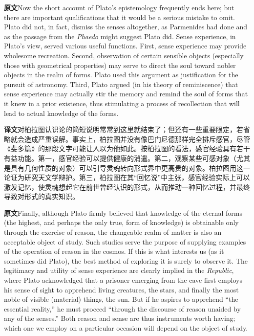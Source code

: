 \documentclass[UTF8,zihao=-4]{ctexart}
\newcommand{\BodyFont}{\fontsize{10.5pt}{15.5pt}\selectfont}
\newcommand{\origlabel}{\textbf{原文}\quad}
\newcommand{\translabel}{\textbf{译文}\quad}
\newcommand{\orig}{\par\noindent\begingroup\BodyFont\origlabel}
\newcommand{\zhline}[1]{\par\endgroup\noindent\begingroup\BodyFont\translabel #1\par\endgroup\vspace{0.35em}}
\begin{document}
\orig Now the short account of Plato's epistemology frequently ends here; but there are important qualifications that it would be a serious mistake to omit. Plato did not, in fact, dismiss the senses altogether, as Parmenides had done and as the passage from the \textit{Phaedo} might suggest Plato did. Sense experience, in Plato's view, served various useful functions. First, sense experience may provide wholesome recreation. Second, observation of certain sensible objects (especially those with geometrical properties) may serve to direct the soul toward nobler objects in the realm of forms. Plato used this argument as justification for the pursuit of astronomy. Third, Plato argued (in his theory of reminiscence) that sense experience may actually stir the memory and remind the soul of forms that it knew in a prior existence, thus stimulating a process of recollection that will lead to actual knowledge of the forms.

\zhline{对柏拉图认识论的简短说明常常到这里就结束了；但还有一些重要限定，若省略就会造成严重误解。事实上，柏拉图并没有像巴门尼德那样完全排斥感官，尽管《斐多篇》的那段文字可能让人以为他如此。按柏拉图的看法，感官经验具有若干有益功能。第一，感官经验可以提供健康的消遣。第二，观察某些可感对象（尤其是具有几何性质的对象）可以引导灵魂转向形式界中更高贵的对象。柏拉图用这一论证为研究天文学辩护。第三，柏拉图在其“回忆说”中主张，感官经验实际上可以激发记忆，使灵魂想起它在前世曾经认识的形式，从而推动一种回忆过程，并最终导致对形式的真实知识。}

\orig Finally, although Plato firmly believed that knowledge of the eternal forms (the highest, and perhaps the only true, form of knowledge) is obtainable only through the exercise of reason, the changeable realm of matter is also an acceptable object of study. Such studies serve the purpose of supplying examples of the operation of reason in the cosmos. If this is what interests us (as it sometimes did Plato), the best method of exploring it is surely to observe it. The legitimacy and utility of sense experience are clearly implied in the \textit{Republic}, where Plato acknowledged that a prisoner emerging from the cave first employs his sense of sight to apprehend living creatures, the stars, and finally the most noble of visible (material) things, the sun. But if he aspires to apprehend ``the essential reality,'' he must proceed ``through the discourse of reason unaided by any of the senses.'' Both reason and sense are thus instruments worth having; which one we employ on a particular occasion will depend on the object of study.
\end{document}
